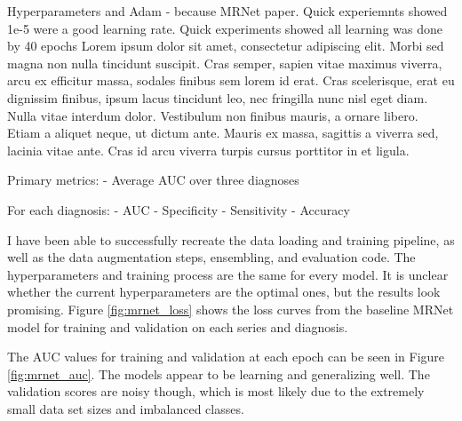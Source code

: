 \documentclass[10pt,twocolumn,letterpaper]{article}
\begin{document}









Hyperparameters and Adam - because MRNet paper. Quick experiemnts showed 1e-5 were a good learning rate. Quick experiments showed all learning was done by 40 epochs
Lorem ipsum dolor sit amet, consectetur adipiscing elit. Morbi sed magna non nulla tincidunt suscipit. Cras semper, sapien vitae maximus viverra, arcu ex efficitur massa, sodales finibus sem lorem id erat. Cras scelerisque, erat eu dignissim finibus, ipsum lacus tincidunt leo, nec fringilla nunc nisl eget diam. Nulla vitae interdum dolor. Vestibulum non finibus mauris, a ornare libero. Etiam a aliquet neque, ut dictum ante. Mauris ex massa, sagittis a viverra sed, lacinia vitae ante. Cras id arcu viverra turpis cursus porttitor in et ligula.

Primary metrics:
- Average AUC over three diagnoses

For each diagnosis:
- AUC
- Specificity
- Sensitivity
- Accuracy

I have been able to successfully recreate the data loading and training pipeline, as well as the data augmentation steps, ensembling, and evaluation code. The hyperparameters and training process are the same for every model. It is unclear whether the current hyperparameters are the optimal ones, but the results look promising. Figure \ref{fig:mrnet_loss} shows the loss curves from the baseline MRNet model for training and validation on each series and diagnosis.

The AUC values for training and validation at each epoch can be seen in Figure \ref{fig:mrnet_auc}. The models appear to be learning and generalizing well. The validation scores are noisy though, which is most likely due to the extremely small data set sizes and imbalanced classes.
\end{document}
